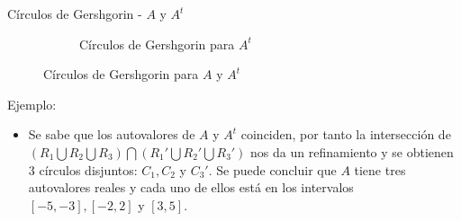 \documentclass[11pt]{beamer}
\begin{document}
\begin{frame}{C\'irculos de Gershgorin - $A$ y $A^t$}
\begin{figure}
\begin{subfigure}{0.48\textwidth}
          \caption{C\'irculos de Gershgorin para $A^t$}          
        \end{subfigure}
        \caption{C\'irculos de Gershgorin para $A$ y $A^t$}        
      \end{figure}
    \end{frame}
    \begin{frame}{Ejemplo:}
      \begin{itemize}
        \item Se sabe que los autovalores de $A$ y $A^t$ coinciden, por tanto
        la intersecci\'on de $(R_1\bigcup R_2\bigcup R_3) \bigcap (R_1' \bigcup R_2' \bigcup R_3')$ nos da un refinamiento y se obtienen 3
        c\'irculos disjuntos: $C_1, C_2$ y $C_3'$. Se puede concluir que $A$ tiene tres autovalores reales y cada uno de ellos est\'a en los
        intervalos $[-5,-3],[-2,2]$ y $[3,5]$.
      \end{itemize}
    \end{frame}
\end{document}
